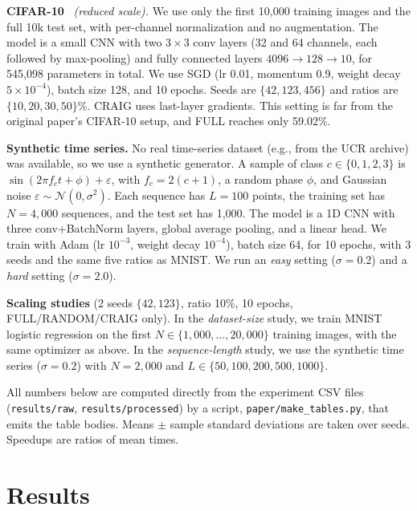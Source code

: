 \documentclass[conference]{IEEEtran}
\begin{document}
\textbf{CIFAR-10}~\cite{krizhevsky2009learning} \emph{(reduced scale).} We use only the first 10,000 training images and the full 10k test set, with per-channel normalization and no augmentation. The model is a small CNN with two $3\times3$ conv layers (32 and 64 channels, each followed by max-pooling) and fully connected layers $4096\rightarrow128\rightarrow10$, for 545,098 parameters in total. We use SGD (lr 0.01, momentum 0.9, weight decay $5\times10^{-4}$), batch size 128, and 10 epochs. Seeds are $\{42,123,456\}$ and ratios are $\{10,20,30,50\}\%$. CRAIG uses last-layer gradients. This setting is far from the original paper's CIFAR-10 setup, and FULL reaches only 59.02\%.

\textbf{Synthetic time series.} No real time-series dataset (e.g., from the UCR archive) was available, so we use a synthetic generator. A sample of class $c\in\{0,1,2,3\}$ is $\sin(2\pi f_c t+\phi)+\varepsilon$, with $f_c=2(c+1)$, a random phase $\phi$, and Gaussian noise $\varepsilon\sim\mathcal{N}(0,\sigma^2)$. Each sequence has $L=100$ points, the training set has $N=4{,}000$ sequences, and the test set has 1,000. The model is a 1D CNN with three conv+BatchNorm layers, global average pooling, and a linear head. We train with Adam (lr $10^{-3}$, weight decay $10^{-4}$), batch size 64, for 10 epochs, with 3 seeds and the same five ratios as MNIST. We run an \emph{easy} setting ($\sigma{=}0.2$) and a \emph{hard} setting ($\sigma{=}2.0$).

\textbf{Scaling studies} (2 seeds $\{42,123\}$, ratio 10\%, 10 epochs, FULL/RANDOM/CRAIG only). In the \emph{dataset-size} study, we train MNIST logistic regression on the first $N\in\{1{,}000,\ldots,20{,}000\}$ training images, with the same optimizer as above. In the \emph{sequence-length} study, we use the synthetic time series ($\sigma{=}0.2$) with $N{=}2{,}000$ and $L\in\{50,100,200,500,1000\}$.

All numbers below are computed directly from the experiment CSV files (\texttt{results/raw}, \texttt{results/processed}) by a script, \texttt{paper/make\_tables.py}, that emits the table bodies. Means $\pm$ sample standard deviations are taken over seeds. Speedups are ratios of mean times.

\section{Results}
\label{sec:results}
\end{document}
